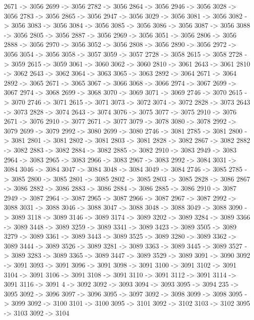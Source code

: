 {	2671 -> 3056
	2699 -> 3056
	2782 -> 3056
	2864 -> 3056
	2946 -> 3056
	3028 -> 3056
	2783 -> 3056
	2865 -> 3056
	2947 -> 3056
	3029 -> 3056
	3081 -> 3056
	3082 -> 3056
	3083 -> 3056
	3084 -> 3056
	3085 -> 3056
	3086 -> 3056
	3087 -> 3056
	3088 -> 3056
	2805 -> 3056
	2887 -> 3056
	2969 -> 3056
	3051 -> 3056
	2806 -> 3056
	2888 -> 3056
	2970 -> 3056
	3052 -> 3056
	2808 -> 3056
	2890 -> 3056
	2972 -> 3056
	3054 -> 3056
	3058 -> 3057
	3059 -> 3057
	2728 -> 3058
	2615 -> 3058
	2728 -> 3059
	2615 -> 3059
	3061 -> 3060
	3062 -> 3060
	2810 -> 3061
	2643 -> 3061
	2810 -> 3062
	2643 -> 3062
	3064 -> 3063
	3065 -> 3063
	2892 -> 3064
	2671 -> 3064
	2892 -> 3065
	2671 -> 3065
	3067 -> 3066
	3068 -> 3066
	2974 -> 3067
	2699 -> 3067
	2974 -> 3068
	2699 -> 3068
	3070 -> 3069
	3071 -> 3069
	2746 -> 3070
	2615 -> 3070
	2746 -> 3071
	2615 -> 3071
	3073 -> 3072
	3074 -> 3072
	2828 -> 3073
	2643 -> 3073
	2828 -> 3074
	2643 -> 3074
	3076 -> 3075
	3077 -> 3075
	2910 -> 3076
	2671 -> 3076
	2910 -> 3077
	2671 -> 3077
	3079 -> 3078
	3080 -> 3078
	2992 -> 3079
	2699 -> 3079
	2992 -> 3080
	2699 -> 3080
	2746 -> 3081
	2785 -> 3081
	2800 -> 3081
	2801 -> 3081
	2802 -> 3081
	2803 -> 3081
	2828 -> 3082
	2867 -> 3082
	2882 -> 3082
	2883 -> 3082
	2884 -> 3082
	2885 -> 3082
	2910 -> 3083
	2949 -> 3083
	2964 -> 3083
	2965 -> 3083
	2966 -> 3083
	2967 -> 3083
	2992 -> 3084
	3031 -> 3084
	3046 -> 3084
	3047 -> 3084
	3048 -> 3084
	3049 -> 3084
	2746 -> 3085
	2785 -> 3085
	2800 -> 3085
	2801 -> 3085
	2802 -> 3085
	2803 -> 3085
	2828 -> 3086
	2867 -> 3086
	2882 -> 3086
	2883 -> 3086
	2884 -> 3086
	2885 -> 3086
	2910 -> 3087
	2949 -> 3087
	2964 -> 3087
	2965 -> 3087
	2966 -> 3087
	2967 -> 3087
	2992 -> 3088
	3031 -> 3088
	3046 -> 3088
	3047 -> 3088
	3048 -> 3088
	3049 -> 3088
	3090 -> 3089
	3118 -> 3089
	3146 -> 3089
	3174 -> 3089
	3202 -> 3089
	3284 -> 3089
	3366 -> 3089
	3448 -> 3089
	3259 -> 3089
	3341 -> 3089
	3423 -> 3089
	3505 -> 3089
	3279 -> 3089
	3361 -> 3089
	3443 -> 3089
	3525 -> 3089
	3280 -> 3089
	3362 -> 3089
	3444 -> 3089
	3526 -> 3089
	3281 -> 3089
	3363 -> 3089
	3445 -> 3089
	3527 -> 3089
	3283 -> 3089
	3365 -> 3089
	3447 -> 3089
	3529 -> 3089
	3091 -> 3090
	3092 -> 3091
	3093 -> 3091
	3096 -> 3091
	3098 -> 3091
	3100 -> 3091
	3102 -> 3091
	3104 -> 3091
	3106 -> 3091
	3108 -> 3091
	3110 -> 3091
	3112 -> 3091
	3114 -> 3091
	3116 -> 3091
	4 -> 3092
	3092 -> 3093
	3094 -> 3093
	3095 -> 3094
	235 -> 3095
	3092 -> 3096
	3097 -> 3096
	3095 -> 3097
	3092 -> 3098
	3099 -> 3098
	3095 -> 3099
	3092 -> 3100
	3101 -> 3100
	3095 -> 3101
	3092 -> 3102
	3103 -> 3102
	3095 -> 3103
	3092 -> 3104
}
